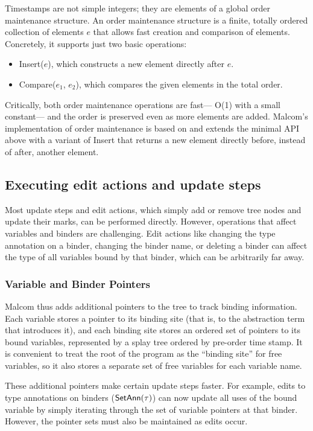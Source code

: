 Timestamps are not simple integers;
  they are elements of a global
  order maintenance structure.
An order maintenance structure is
  a finite, totally ordered collection of elements $e$
  that allows fast creation and comparison of elements.
Concretely, it supports just two basic operations:
\begin{itemize}
    \item Insert($e$),
      which constructs a new element directly after $e$. 
    \item Compare($e_1$, $e_2$), which compares the given elements in the total order. 
\end{itemize}
Critically, both order maintenance operations are fast---%
  O(1) with a small constant---%
  and the order is preserved even as
  more elements are added.
Malcom's implementation of order maintenance
  is based on \citet{DBLP:conf/esa/BenderCDFZ02}
  and extends the minimal API above
  with a variant of Insert that returns a new element
  directly before, instead of after, another element.

\subsection{Executing edit actions and update steps}

Most update steps and edit actions, which simply add or remove tree nodes and update their marks, can be performed directly.
However, operations that affect variables and binders are challenging. Edit actions like changing the type annotation on a binder, changing the binder name, or deleting a binder can affect the type of all variables bound by that binder, which can be arbitrarily far away.

\subsubsection{Variable and Binder Pointers}

Malcom thus adds additional pointers to the tree to track binding information. Each variable stores a pointer to its binding site (that is, to the abstraction term that introduces it), and each binding site stores an ordered set of pointers to its bound variables, represented by a splay tree ordered by pre-order time stamp. It is convenient to treat the root of the program as the ``binding site'' for free variables, so it also stores a separate set of free variables for each variable name.

These additional pointers make certain update steps faster. For example, edits to type annotations on binders (${\normalfont\textsf{SetAnn}}(\tau)$) can now update all uses of the bound variable by simply iterating through the set of variable pointers at that binder. However, the pointer sets must also be maintained as edits occur.


